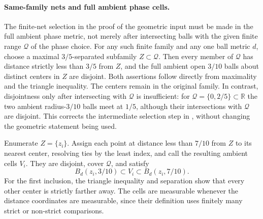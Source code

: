 \documentclass[11pt]{article}
\numberwithin{equation}{section}
\theoremstyle{remark}
\theoremstyle{definition}
\newcommand{\R}{\mathbb R}
\begin{document}
\paragraph{Same-family nets and full ambient phase cells.}
The finite-net selection in the proof of the geometric input must be
made in the full ambient phase metric, not merely after intersecting
balls with the given finite range $\mathcal Q$ of the phase choice.
For any such finite family and any one ball metric $d$, choose a maximal
$3/5$-separated subfamily $Z\subset\mathcal Q$. Then every member of
$\mathcal Q$ has distance strictly less than $3/5$ from $Z$, and the full
ambient open $3/10$ balls about distinct centers in $Z$ are disjoint.
Both assertions follow directly from maximality and the triangle
inequality. The centers remain in the original family. In contrast,
disjointness only after intersecting with $\mathcal Q$ is insufficient:
for $\mathcal Q=\{0,2/5\}\subset\R$ the two ambient radius-$3/10$
balls meet at $1/5$, although their intersections with $\mathcal Q$ are
disjoint. This corrects the intermediate selection step in
\cite[Lemma 3.2 and (3.1)]{BDJST}, without changing the geometric
statement being used.

Enumerate $Z=\{z_i\}$. Assign each point at distance less than $7/10$
from $Z$ to its nearest center, resolving ties by the least index, and
call the resulting ambient cells $V_i$. They are disjoint, cover
$\mathcal Q$, and satisfy
\begin{equation}\label{eq:ambient-base-cells}
 B_d(z_i,3/10)\subset V_i\subset B_d(z_i,7/10).
\end{equation}
For the first inclusion, the triangle inequality and separation show
that every other center is strictly farther away. The cells are
measurable whenever the distance coordinates are measurable, since
their definition uses finitely many strict or non-strict comparisons.
\end{document}
